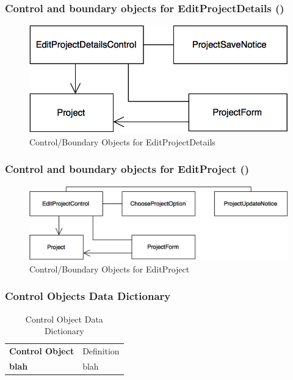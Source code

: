 \documentclass[12pt,letterpaper]{article}
\begin{document}
\subsubsection*{Control and boundary objects for EditProjectDetails (\editprojectdetails{})}

\begin{figure}[H]
	\centering{}
	\includegraphics[scale=0.4]{imgs/cbod/edit-project-details.png}
	\caption{Control/Boundary Objects for EditProjectDetails}    
\end{figure}

\subsubsection*{Control and boundary objects for EditProject (\editproject{})}

\begin{figure}[H]
	\centering{}
	\includegraphics[scale=0.4]{imgs/cbod/edit-project.png}
	\caption{Control/Boundary Objects for EditProject}    
\end{figure}

\subsubsection*{Control Objects Data Dictionary}

\begin{table}[H]
\caption{Control Object Data Dictionary}
	\begin{tabu} to 
		\tableheader{}Control Object & Definition\\
		blah & blah\\
		
	\end{tabu}
\end{table}
\end{document}
